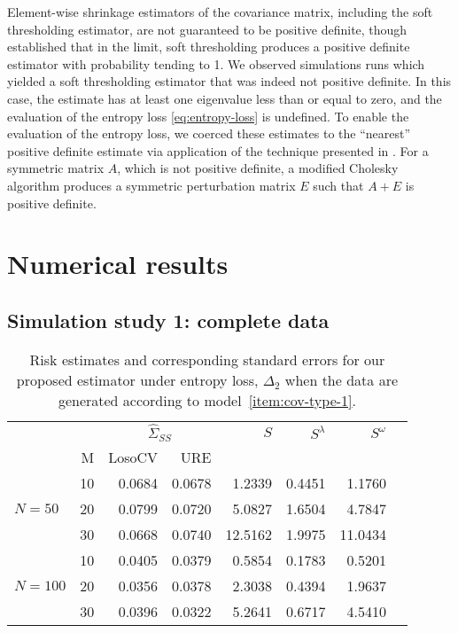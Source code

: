 \documentclass[12pt]{article}
\newcommand*\needsparaphrased{\color{red}}
\theoremstyle{definition}
\begin{document}
Element-wise shrinkage estimators of the covariance matrix, including the soft thresholding estimator, are not guaranteed to be positive definite, though \citet{rothman2009generalized} established that in the limit, soft thresholding produces a positive definite estimator with probability tending to 1.  We observed simulations runs which yielded a soft thresholding estimator that was indeed not positive definite.   In this case, the estimate has at least one eigenvalue less than or equal to zero, and the evaluation of the entropy loss \ref{eq:entropy-loss} is undefined. To enable the evaluation of the entropy loss, we coerced these estimates to the ``nearest'' positive definite estimate via application of the technique presented in \citet{cheng1998modified}.  For a symmetric matrix $A$, which is not positive definite,  a modified Cholesky algorithm produces a symmetric perturbation matrix $E$ such that $A + E$ is positive definite.

\bigskip

{\needsparaphrased{We need to decide which tables will be included in the non-appendix numerical results. In the actual dissertation, section 6 will not immediate follow section 5.}}

\bigskip

\section{Numerical results}
\subsection{Simulation study 1: complete data}

\setlength{\dashlinedash}{0.5pt}
\setlength{\dashlinegap}{1pt}
\setlength{\arrayrulewidth}{0.2pt}

\begin{table}[H] \label{table:simulation-1-entropy-loss-sigma-1}
\centering
\caption{Risk estimates and corresponding standard errors for our proposed estimator under entropy loss, $\Delta_2$ when the data are generated according to model~\ref{item:cov-type-1}.} 
\begin{tabular}{l|r|rrrrrr}
&  & \multicolumn{2}{c}{$\hat{\Sigma}_{SS}$} & $S$ & $S^\lambda$ & $S^\omega$ \\ 
&M & \mbox{LosoCV} & \mbox{URE} &  \\ 
  \hline
&    10 & 0.0684 & 	0.0678	&1.2339 & 0.4451 & 1.1760\\ 
$N = 50$ &    20 & 0.0799 & 	0.0720	&5.0827 & 1.6504 & 4.7847 \\ 
  &    30 & 0.0668 &	0.0740	 &12.5162  & 1.9975 & 11.0434 \\ 
   \hdashline
 &    10 & 0.0405 & 0.0379 & 0.5854  & 0.1783 & 0.5201 \\ 
$N = 100$ &    20 & 0.0356 &  0.0378 & 2.3038 & 0.4394 & 1.9637 \\ 
  &    30 & 0.0396 & 0.0322  &5.2641 & 0.6717 & 4.5410 \\ 
\end{tabular}
\end{table}
\end{document}
